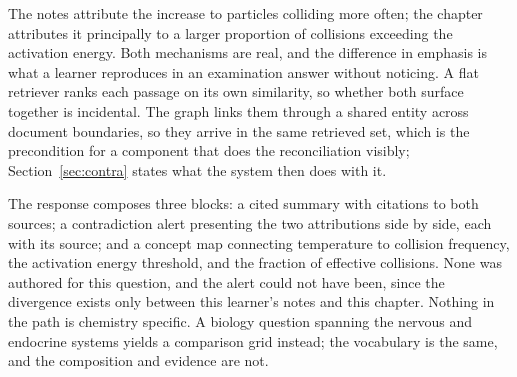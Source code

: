 \documentclass[conference]{IEEEtran}
\begin{document}
The notes attribute the increase to particles colliding more often; the chapter attributes it principally to a larger proportion of collisions exceeding the activation energy. Both mechanisms are real, and the difference in emphasis is what a learner reproduces in an examination answer without noticing. A flat retriever ranks each passage on its own similarity, so whether both surface together is incidental. The graph links them through a shared entity across document boundaries, so they arrive in the same retrieved set, which is the precondition for a component that does the reconciliation visibly; Section~\ref{sec:contra} states what the system then does with it.

The response composes three blocks: a cited summary with citations to both sources; a contradiction alert presenting the two attributions side by side, each with its source; and a concept map connecting temperature to collision frequency, the activation energy threshold, and the fraction of effective collisions. None was authored for this question, and the alert could not have been, since the divergence exists only between this learner's notes and this chapter. Nothing in the path is chemistry specific. A biology question spanning the nervous and endocrine systems yields a comparison grid instead; the vocabulary is the same, and the composition and evidence are not.
\end{document}
